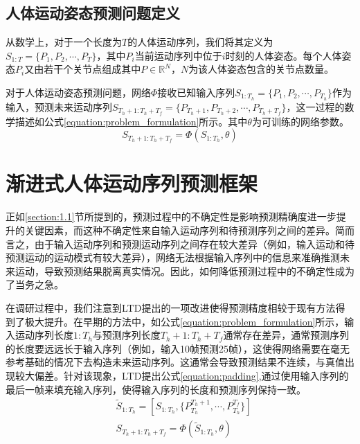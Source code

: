 \subsection{人体运动姿态预测问题定义}
从数学上，对于一个长度为$T$的人体运动序列，我们将其定义为$S_{1:T} = \{P_1,P_2,\cdots,P_{T}\}$，其中$P_i$当前运动序列中位于$i$时刻的人体姿态。每个人体姿态$P_i$又由若干个关节点组成其中$P \in \mathbb{R}^N$，$N$为该人体姿态包含的关节点数量。

对于人体运动姿态预测问题，网络$\Phi$接收已知输入序列$S_{1:T_h} = \{P_1,P_2,\cdots,P_{T_h}\}$作为输入，预测未来运动序列$S_{T_h+1:T_h+T_f} = \{P_{T_h+1},P_{T_h+2},\cdots,P_{T_h+T_f}\}$，这一过程的数学描述如公式\ref{equation:problem_formulation}所示。其中$\theta$为可训练的网络参数。
\begin{equation}
    S_{T_h+1:T_h+T_f} = \Phi(S_{1:T_h}, \theta) \label{equation:problem_formulation}
\end{equation}

\section{渐进式人体运动序列预测框架}
正如\ref{section:1.1}节所提到的，预测过程中的不确定性是影响预测精确度进一步提升的关键因素，而这种不确定性来自输入运动序列和待预测序列之间的差异。简而言之，由于输入运动序列和预测运动序列之间存在较大差异（例如，输入运动和待预测运动的运动模式有较大差异），网络无法根据输入序列中的信息来准确推测未来运动，导致预测结果脱离真实情况。因此，如何降低预测过程中的不确定性成为了当务之急。

在调研过程中，我们注意到LTD\parencite{mao2019learning}提出的一项改进使得预测精度相较于现有方法得到了极大提升。在早期的方法中，如公式\ref{equation:problem_formulation}所示，输入运动序列长度$1:T_h$与预测序列长度$T_h+1:T_h+T_f$通常存在差异，通常预测序列的长度要远远长于输入序列（例如，输入10帧预测25帧），这使得网络需要在毫无参考基础的情况下去构造未来运动序列。这通常会导致预测结果不连续，与真值出现较大偏差。针对该现象，LTD\parencite{mao2019learning}提出公式\ref{equation:padding},通过使用输入序列的最后一帧来填充输入序列，使得输入序列的长度和预测序列保持一致。
\begin{equation}
    \begin{aligned}
        &\widetilde{S}_{1:T_h} = [S_{1:T_h}, \{P^{T_h+1}_{T_h}, \cdots, P^{T_f}_{T_h} \} ]
        \\
        &S_{T_h+1:T_h+T_f} = \Phi(\widetilde{S}_{1:T_h}, \theta)
    \end{aligned}
    \label{equation:padding}
\end{equation}

